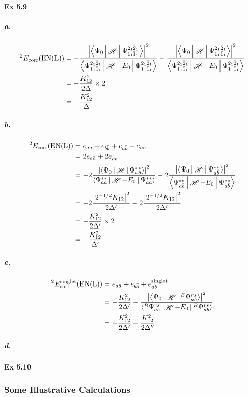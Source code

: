 \documentclass[a4paper]{article}
\DeclareMathOperator{\sH}{\mathscr{H}}
\DeclareMathOperator{\corr}{\mathrm{corr}}
\newcommand{\ex}[1]{\paragraph{Ex #1}}
\newcommand{\subex}[1]{\subparagraph{#1}}
\numberwithin{equation}{subsection}
\begin{document}
\ex{5.9}
\subex{a.}
\begin{align}
{^2 }E_{\corr}(\text{EN(L)}) 
&= -\dfrac{\abs{\Braket{\Psi_0|\sH|\Psi_{1_1\bar{1}_1}^{2_1\bar{2}_1}}}^2 }{\Braket{\Psi_{1_1\bar{1}_1}^{2_1\bar{2}_1} | \sH - E_0 | \Psi_{1_1\bar{1}_1}^{2_1\bar{2}_1}}} 
- \dfrac{\abs{\Braket{\Psi_0|\sH|\Psi_{1_1\bar{1}_1}^{2_1\bar{2}_1}}}^2 }{\Braket{\Psi_{1_1\bar{1}_1}^{2_1\bar{2}_1} | \sH - E_0 | \Psi_{1_1\bar{1}_1}^{2_1\bar{2}_1}}} \notag\\
&= -\dfrac{K_{12}^2}{2\Delta}\times 2 \notag\\
&= -\dfrac{K_{12}^2}{\Delta}
\end{align}
\subex{b.}
\begin{align}
{^2 }E_{\corr}(\text{EN(L)}) &= e_{a\bar{a}} + e_{b\bar{b}} + e_{a\bar{b}} + e_{\bar{a}b} \notag\\
&= 2e_{a\bar{a}} + 2e_{a\bar{b}} \notag\\
&= -2\dfrac{\abs{\Braket{\Psi_0|\sH|\Psi_{a\bar{a}}^{**}}}^2 }{\Braket{\Psi_{a\bar{a}}^{**} | \sH-E_0 | \Psi_{a\bar{a}}^{**}}} 
- 2\dfrac{\abs{\Braket{\Psi_0|\sH|\Psi_{a\bar{b}}^{**}}}^2 }{\Braket{\Psi_{a\bar{b}}^{**} | \sH - E_0 | \Psi_{a\bar{b}}^{**}}} 
\notag\\
&= -2\dfrac{\abs{2^{-1/2}K_{12}}^2}{2\Delta'} -2\dfrac{\abs{2^{-1/2}K_{12}}^2}{2\Delta'} \notag\\
&= -\dfrac{K_{12}^2}{2\Delta'}\times 2 \notag\\
&= -\dfrac{K_{12}^2}{\Delta'}
\end{align}
\subex{c.}
\begin{align}
{^2 }E_{\corr}^{\text{singlet}}(\text{EN(L)}) &= e_{a\bar{a}} + e_{b\bar{b}} + e_{ab}^{\text{singlet}} \notag\\
&= -\dfrac{K_{12}^2}{2\Delta'} -\dfrac{\abs{\Braket{\Psi_0|\sH| ^B\Psi_{ab}^{rs}}}^2 }{\Braket{ ^B\Psi_{ab}^{rs} | \sH-E_0 | ^B\Psi_{ab}^{rs}}}  \notag\\
&= -\dfrac{K_{12}^2}{2\Delta'} -\dfrac{K_{12}^2}{2\Delta''}
\end{align}
\subex{d.}


\ex{5.10}



\subsubsection{Some Illustrative Calculations}
\end{document}
